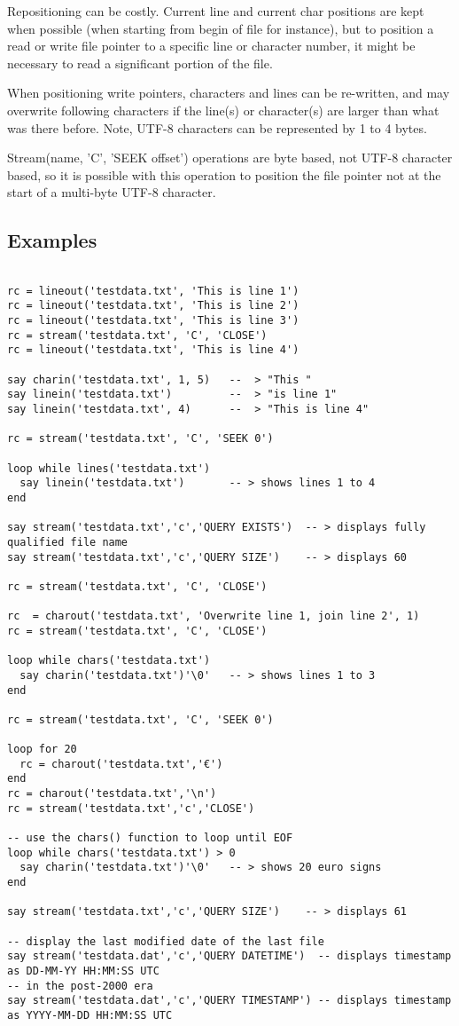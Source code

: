 Repositioning can be costly. Current line and current char positions are kept when
possible (when starting from begin of file for instance),
 but to position a read or write file pointer to a specific line or character
number, it might be necessary to read a significant portion of the file.

When positioning write pointers, characters and lines can be
re-written, and may overwrite following characters if the line(s) or
character(s) are larger than what was there before. Note, UTF-8 characters can be represented by 1 to 4 bytes.

Stream(name, 'C', 'SEEK offset') operations are byte based, not UTF-8 character based, so it is possible
with this operation to position the file pointer not at the start of a multi-byte UTF-8 character.


\subsection{Examples}
\begin{lstlisting}[label=datessexample,caption=Example of using Date()]

rc = lineout('testdata.txt', 'This is line 1')
rc = lineout('testdata.txt', 'This is line 2')
rc = lineout('testdata.txt', 'This is line 3')
rc = stream('testdata.txt', 'C', 'CLOSE')
rc = lineout('testdata.txt', 'This is line 4')

say charin('testdata.txt', 1, 5)   --  > "This "
say linein('testdata.txt')         --  > "is line 1"
say linein('testdata.txt', 4)      --  > "This is line 4"

rc = stream('testdata.txt', 'C', 'SEEK 0')

loop while lines('testdata.txt')
  say linein('testdata.txt')       -- > shows lines 1 to 4
end

say stream('testdata.txt','c','QUERY EXISTS')  -- > displays fully qualified file name
say stream('testdata.txt','c','QUERY SIZE')    -- > displays 60

rc = stream('testdata.txt', 'C', 'CLOSE')

rc  = charout('testdata.txt', 'Overwrite line 1, join line 2', 1)
rc = stream('testdata.txt', 'C', 'CLOSE')

loop while chars('testdata.txt')
  say charin('testdata.txt')'\0'   -- > shows lines 1 to 3
end

rc = stream('testdata.txt', 'C', 'SEEK 0')

loop for 20
  rc = charout('testdata.txt','€')
end
rc = charout('testdata.txt','\n')
rc = stream('testdata.txt','c','CLOSE')

-- use the chars() function to loop until EOF
loop while chars('testdata.txt') > 0
  say charin('testdata.txt')'\0'   -- > shows 20 euro signs
end

say stream('testdata.txt','c','QUERY SIZE')    -- > displays 61

-- display the last modified date of the last file
say stream('testdata.dat','c','QUERY DATETIME')  -- displays timestamp as DD-MM-YY HH:MM:SS UTC
-- in the post-2000 era
say stream('testdata.dat','c','QUERY TIMESTAMP') -- displays timestamp as YYYY-MM-DD HH:MM:SS UTC

\end{lstlisting}
